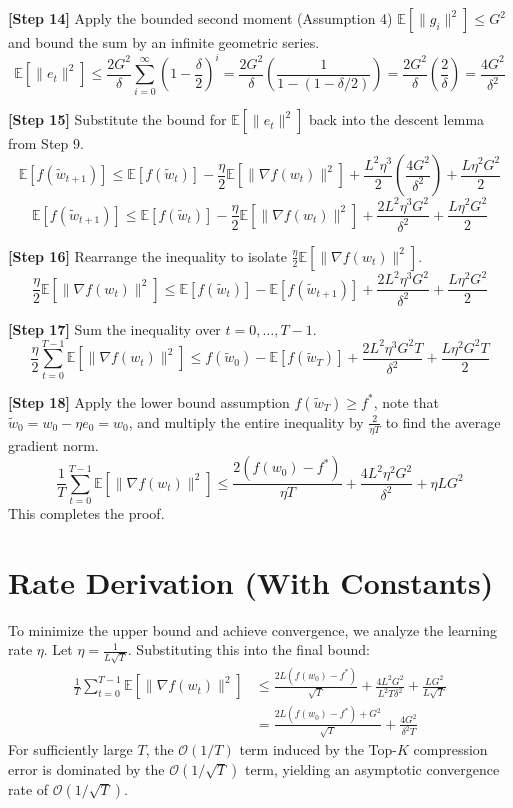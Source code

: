 \documentclass{article}
\begin{document}
\textbf{[Step 14]} Apply the bounded second moment (Assumption 4) $\mathbb{E}[\|g_i\|^2] \leq G^2$ and bound the sum by an infinite geometric series.
$$ \mathbb{E}[\|e_t\|^2] \leq \frac{2 G^2}{\delta} \sum_{i=0}^{\infty} \left(1 - \frac{\delta}{2}\right)^i = \frac{2 G^2}{\delta} \left( \frac{1}{1 - (1 - \delta/2)} \right) = \frac{2 G^2}{\delta} \left( \frac{2}{\delta} \right) = \frac{4 G^2}{\delta^2} $$

\textbf{[Step 15]} Substitute the bound for $\mathbb{E}[\|e_t\|^2]$ back into the descent lemma from Step 9.
$$ \mathbb{E}[f(\tilde{w}_{t+1})] \leq \mathbb{E}[f(\tilde{w}_t)] - \frac{\eta}{2}\mathbb{E}[\|\nabla f(w_t)\|^2] + \frac{L^2 \eta^3}{2} \left( \frac{4 G^2}{\delta^2} \right) + \frac{L\eta^2 G^2}{2} $$
$$ \mathbb{E}[f(\tilde{w}_{t+1})] \leq \mathbb{E}[f(\tilde{w}_t)] - \frac{\eta}{2}\mathbb{E}[\|\nabla f(w_t)\|^2] + \frac{2 L^2 \eta^3 G^2}{\delta^2} + \frac{L\eta^2 G^2}{2} $$

\textbf{[Step 16]} Rearrange the inequality to isolate $\frac{\eta}{2}\mathbb{E}[\|\nabla f(w_t)\|^2]$.
$$ \frac{\eta}{2}\mathbb{E}[\|\nabla f(w_t)\|^2] \leq \mathbb{E}[f(\tilde{w}_t)] - \mathbb{E}[f(\tilde{w}_{t+1})] + \frac{2 L^2 \eta^3 G^2}{\delta^2} + \frac{L\eta^2 G^2}{2} $$

\textbf{[Step 17]} Sum the inequality over $t = 0, \dots, T-1$.
$$ \frac{\eta}{2} \sum_{t=0}^{T-1} \mathbb{E}[\|\nabla f(w_t)\|^2] \leq f(\tilde{w}_0) - \mathbb{E}[f(\tilde{w}_T)] + \frac{2 L^2 \eta^3 G^2 T}{\delta^2} + \frac{L\eta^2 G^2 T}{2} $$

\textbf{[Step 18]} Apply the lower bound assumption $f(\tilde{w}_T) \geq f^*$, note that $\tilde{w}_0 = w_0 - \eta e_0 = w_0$, and multiply the entire inequality by $\frac{2}{\eta T}$ to find the average gradient norm.
$$ \frac{1}{T} \sum_{t=0}^{T-1} \mathbb{E}[\|\nabla f(w_t)\|^2] \leq \frac{2(f(w_0) - f^*)}{\eta T} + \frac{4 L^2 \eta^2 G^2}{\delta^2} + \eta L G^2 $$
This completes the proof.

\section*{Rate Derivation (With Constants)}
To minimize the upper bound and achieve convergence, we analyze the learning rate $\eta$.
Let $\eta = \frac{1}{L \sqrt{T}}$.
Substituting this into the final bound:
\begin{align*}
    \frac{1}{T} \sum_{t=0}^{T-1} \mathbb{E}[\|\nabla f(w_t)\|^2] &\leq \frac{2 L (f(w_0) - f^*)}{\sqrt{T}} + \frac{4 L^2 G^2}{L^2 T \delta^2} + \frac{L G^2}{L \sqrt{T}} \\
    &= \frac{2 L (f(w_0) - f^*) + G^2}{\sqrt{T}} + \frac{4 G^2}{\delta^2 T}
\end{align*}
For sufficiently large $T$, the $\mathcal{O}(1/T)$ term induced by the Top-$K$ compression error is dominated by the $\mathcal{O}(1/\sqrt{T})$ term, yielding an asymptotic convergence rate of $\mathcal{O}(1/\sqrt{T})$.
\end{document}
